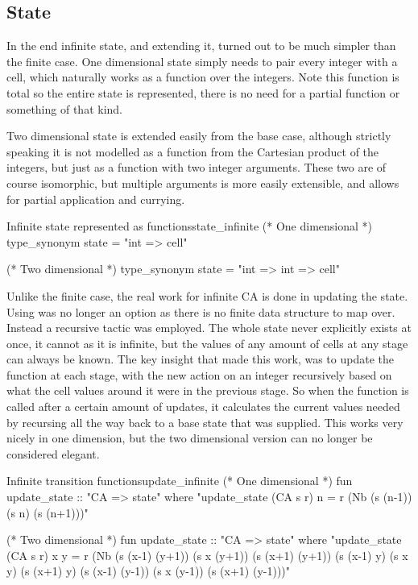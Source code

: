 \subsection{State}

In the end infinite state,
and extending it,
turned out to be much simpler than the finite case.
One dimensional state simply needs to pair every integer with a cell,
which naturally works as a function over the integers.
Note this function is total so the entire state is represented,
there is no need for a partial function or something of that kind.

Two dimensional state is extended easily from the base case,
although strictly speaking it is not modelled as a function from the Cartesian product of the integers,
but just as a function with two integer arguments.
These two are of course isomorphic,
but multiple arguments is more easily extensible,
and allows for partial application and currying.

\begin{myminted}{Infinite state represented as functions}{state_infinite}
    (* One dimensional *)
    type_synonym state = "int => cell"

    (* Two dimensional *)
    type_synonym state = "int => int => cell"
\end{myminted}

Unlike the finite case,
the real work for infinite CA is done in updating the state.
Using  was no longer an option as there is no finite data structure to map over.
Instead a recursive tactic was employed.
The whole state never explicitly exists at once,
it cannot as it is infinite,
but the values of any amount of cells at any stage can always be known.
The key insight that made this work,
was to update the  function at each stage,
with the new action on an integer recursively based on what the cell values around it were in the previous stage.
So when the function is called after a certain amount of updates,
it calculates the current values needed by recursing all the way back to a base state that was supplied.
This works very nicely in one dimension,
but the two dimensional version can no longer be considered elegant.

\begin{myminted}{Infinite transition functions}{update_infinite}
    (* One dimensional *)
    fun update_state :: "CA => state" where
    "update_state (CA s r) n = r (Nb (s (n-1)) (s n) (s (n+1)))"

    (* Two dimensional *)
    fun update_state :: "CA => state" where
    "update_state (CA s r) x y =
        r (Nb (s (x-1) (y+1)) (s x (y+1)) (s (x+1) (y+1))
              (s (x-1)  y)    (s x  y)    (s (x+1)  y)
              (s (x-1) (y-1)) (s x (y-1)) (s (x+1) (y-1)))"
\end{myminted}

